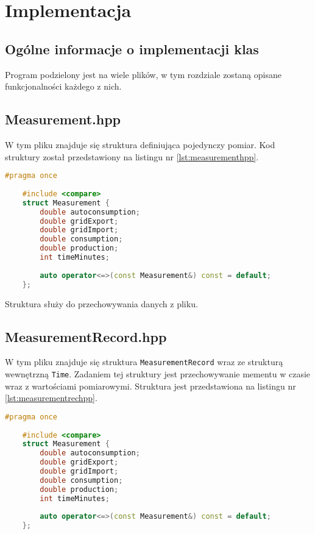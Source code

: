 	\newpage
\section{Implementacja}		%

\subsection{Ogólne informacje o implementacji klas}

Program podzielony jest na wiele plików, w tym rozdziale zostaną opisane funkcjonalności każdego z nich.

\subsection{Measurement.hpp}
W tym pliku znajduje się struktura definiująca pojedynczy pomiar. Kod struktury został przedstawiony na listingu nr \ref{lst:measurementhpp}.

\begin{lstlisting}[caption=Zawartość pliku \texttt{Measurement.hpp}, label={lst:measurementhpp}, language=C++]
	#pragma once
	
	#include <compare>
	struct Measurement {
		double autoconsumption;
		double gridExport;
		double gridImport;
		double consumption;
		double production;
		int timeMinutes;
		
		auto operator<=>(const Measurement&) const = default;
	};
\end{lstlisting}
Struktura służy do przechowywania danych z pliku.

\subsection{MeasurementRecord.hpp}
W tym pliku znajduje się struktura \texttt{MeasurementRecord} wraz ze strukturą wewnętrzną \texttt{Time}. Zadaniem tej struktury jest przechowywanie mementu w czasie wraz z wartościami pomiarowymi. Struktura jest przedstawiona na listingu nr \ref{lst:measurementrechpp}.

\begin{lstlisting}[caption=Zawartość pliku \texttt{MeasurementRecord.hpp}, label={lst:measurementrechpp}, language=C++]
	#pragma once
	
	#include <compare>
	struct Measurement {
		double autoconsumption;
		double gridExport;
		double gridImport;
		double consumption;
		double production;
		int timeMinutes;
		
		auto operator<=>(const Measurement&) const = default;
	};
\end{lstlisting}

